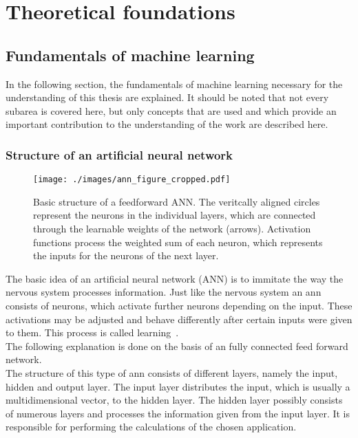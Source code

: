 \chapter{Theoretical foundations}\label{theoreticalfound}
\section{Fundamentals of machine learning}\label{fundmachinelearning}
In the following section, the fundamentals of machine learning necessary for the understanding of this thesis are explained. 
It should be noted that not every subarea is covered here, but only concepts that are used and which provide an important contribution to the understanding of the work are described here.
\subsection{Structure of an artificial neural network}
\begin{figure}[bt]
    \begin{center}
     \texttt{[image: ./images/ann\_figure\_cropped.pdf]}
    \caption[ANN structure.]{{Basic structure of a feedforward ANN. 
        The veritcally aligned circles represent the neurons in the individual layers, which are connected through the learnable weights of the network (arrows).
        Activation functions process the weighted sum of each neuron, which represents the inputs for the neurons of the next layer.}\label{artificial_neural_network_figure}}
    \end{center}
\end{figure}
The basic idea of an artificial neural network (ANN) is to immitate the way the nervous system processes information. 
Just like the nervous system an \acs{ann} consists of neurons, which activate further neurons depending on the input.
These activations may be adjusted and behave differently after certain inputs were given to them. This process is called learning~\cite[1-3]{aggarwal2018neural}.\\
The following explanation is done on the basis of an fully connected feed forward network.\\
The structure of this type of \acs{ann} consists of different layers, namely the input, hidden and output layer.
The input layer distributes the input, which is usually a multidimensional vector, to the hidden layer.
The hidden layer possibly consists of numerous layers and processes the information given from the input layer.
It is responsible for performing the calculations of the chosen application.
